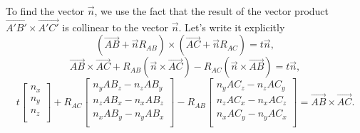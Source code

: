 \documentclass[
11pt,
tightenlines,
twoside,
onecolumn,
nofloats,
nobibnotes,
nofootinbib,
superscriptaddress,
noshowpacs,
centertags]
{revtex4-2}
\begin{document}
To find the vector $\vec{n}$, we use the fact that  the result of
the vector product $\vec{A'B'} \times \vec{A'C'}$ is collinear to
the vector $\vec{n}$.
Let's write it explicitly
\begin{equation}
(\vec{AB} + \vec{n} R_{AB}) \times (\vec{AC} + \vec{n} R_{AC}) = t
\vec{n},
\end{equation}
\begin{equation}
\vec{AB} \times \vec{AC} + R_{AB} (\vec{n} \times \vec{AC}) - R_{AC}
(\vec{n} \times \vec{AB}) = t \vec{n},
\end{equation}
\begin{equation}
t
\left[ { \begin{array}{c}
            n_x \\
            n_y \\
            n_z \\
         \end{array} } \right]
+ R_{AC}
\left[ { \begin{array}{c}
            n_y AB_z - n_z AB_y  \\
            n_z AB_x - n_x AB_z \\
            n_x AB_y - n_y AB_x \\
         \end{array} } \right]
- R_{AB}
\left[ { \begin{array}{c}
            n_y AC_z - n_z AC_y \\
            n_z AC_x - n_x AC_z \\
            n_x AC_y - n_y AC_x \\
         \end{array} } \right]
= \vec{AB} \times \vec{AC}.
\end{equation}
\end{document}

